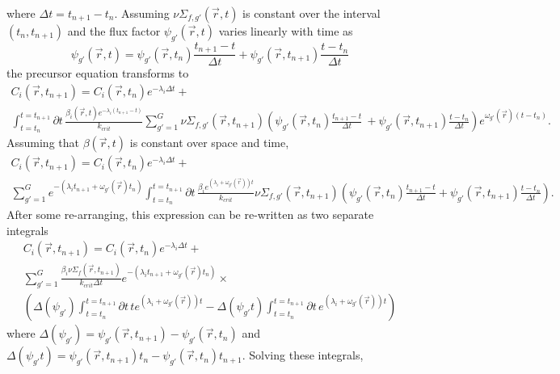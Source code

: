 \documentclass[12pt]{report}
\begin{document}
	where $\Delta t = t_{n+1} - t_n$. Assuming $\nu \Sigma_{f,g'}(\vec{r},t)$ is constant over the interval $(t_n, t_{n+1})$ and the flux factor $\psi_{g'}(\vec{r},t)$ varies linearly with time as
	\begin{equation}
	\psi_{g'}(\vec{r},t) = \psi_{g'}(\vec{r},t_n) \frac{t_{n+1}-t}{\Delta t} + \psi_{g'}(\vec{r},t_{n+1}) \frac{t-t_n}{\Delta t} 
	\end{equation}
	the precursor equation transforms to
	\begin{eqnarray}
	C_i(\vec{r},t_{n+1}) =  C_i(\vec{r},t_{n}) e^{-\lambda_i \Delta t} + \nonumber \\  \int_{t=t_n}^{t=t_{n+1}}  \partial t \, \frac{\beta_i(\vec{r},t) e^{-\lambda_i \left(t_{n+1} - t \right)}}{k_{crit}} \sum_{g'=1}^{G} \nu \Sigma_{f,g'}(\vec{r},t_{n+1}) \left( \psi_{g'}(\vec{r},t_n) \frac{t_{n+1}-t}{\Delta t} \ + \psi_{g'}(\vec{r},t_{n+1}) \frac{t-t_n}{\Delta t} \right) e^{\omega_{g'}(\vec{r}) (t-t_n)}. \nonumber
	\end{eqnarray}
	Assuming that $\beta(\vec{r},t)$ is constant over space and time,
	\begin{eqnarray}
	C_i(\vec{r},t_{n+1}) =  C_i(\vec{r},t_{n}) e^{-\lambda_i \Delta t} + \nonumber \\  \sum_{g'=1}^{G} e^{-\left(\lambda_i t_{n+1} + \omega_{g'}(\vec{r})t_n \right)} \int_{t=t_n}^{t=t_{n+1}}  \partial t \, \frac{\beta_i e^{\left(\lambda_i + \omega_{g'}(\vec{r}) \right)  t}}{k_{crit}}  \nu \Sigma_{f,g'}(\vec{r},t_{n+1}) \left( \psi_{g'}(\vec{r},t_n) \frac{t_{n+1}-t}{\Delta t} + \psi_{g'}(\vec{r},t_{n+1}) \frac{t-t_n}{\Delta t}  \right). \nonumber
	\end{eqnarray}
	After some re-arranging, this expression can be re-written as two separate integrals
	\begin{eqnarray}
	C_i(\vec{r},t_{n+1}) =  C_i(\vec{r},t_{n}) e^{-\lambda_i \Delta t} + \nonumber \\  \sum_{g'=1}^{G} \frac{\beta_i \nu\Sigma_f(\vec{r},t_{n+1})}{k_{crit} \Delta t} e^{-\left(\lambda_i t_{n+1} + \omega_{g'}(\vec{r}) t_n \right)} 
	\times \nonumber \\ 
	\left(  \Delta(\psi_{g'}) \int_{t=t_n}^{t=t_{n+1}}  \partial t \, t e^{\left(\lambda_i + \omega_{g'}(\vec{r}) \right)  t} - \Delta(\psi_{g'} t) \int_{t=t_n}^{t=t_{n+1}}  \partial t \, e^{\left(\lambda_i + \omega_{g'}(\vec{r}) \right)  t} \right) \nonumber
	\end{eqnarray}
	where $\Delta(\psi_{g'}) =   \psi_{g'}(\vec{r},t_{n+1}) - \psi_{g'}(\vec{r},t_n)$ and $\Delta(\psi_{g'}t) =   \psi_{g'}(\vec{r},t_{n+1}) t_n - \psi_{g'}(\vec{r},t_n) t_{n+1}$. Solving these integrals,	
\end{document}
